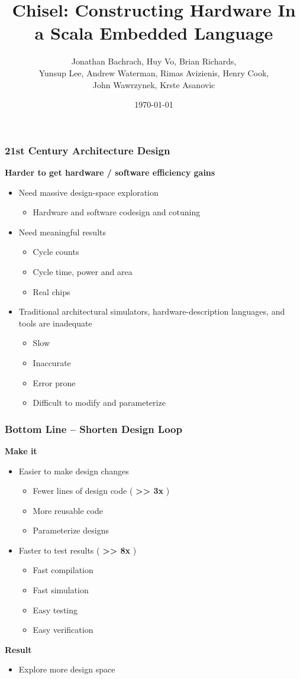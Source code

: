 \documentclass[xcolor=pdflatex,dvipsnames,table]{beamer}
\title[Chisel]{Chisel: Constructing Hardware In a Scala Embedded Language}
\author[Bachrach et al]{Jonathan Bachrach, Huy Vo, Brian Richards, \\
Yunsup Lee, Andrew Waterman, Rimas Avizienis, Henry Cook, \\
John Wawrzynek, Krste Asanovic}
\date{\today}
\institute[parlab]{EECS UC Berkeley}
\begin{document}
{
\begin{frame}
  \titlepage
\end{frame}
}
\addtocounter{framenumber}{-1}

\begin{frame}[fragile]
\frametitle{21st Century Architecture Design}
{\Large\textbf{Harder to get hardware / software efficiency gains}}
\vskip5mm
\begin{itemize}
\item Need massive design-space exploration
\begin{itemize}
\item Hardware and software codesign and cotuning
\end{itemize}
\item Need meaningful results
\begin{itemize}
\item Cycle counts
\item Cycle time, power and area
\item Real chips
\end{itemize}
\item Traditional architectural simulators, hardware-description
  languages, and tools are inadequate
\begin{itemize}
\item Slow
\item Inaccurate
\item Error prone
\item Difficult to modify and parameterize
\end{itemize}
\end{itemize}
\end{frame}

\begin{frame}[fragile]
\frametitle{Bottom Line -- Shorten Design Loop}
{\LARGE\textbf{Make it}}
\vskip2mm
\begin{itemize}
\item Easier to make design changes
\begin{itemize}
\item Fewer lines of design code ( \textbf{>> 3x} )
\item More reusable code
\item Parameterize designs
\end{itemize}
\item Faster to test results ( \textbf{>> 8x} )
\begin{itemize}
\item Fast compilation
\item Fast simulation
\item Easy testing
\item Easy verification
\end{itemize}
\end{itemize}
\vskip0.8cm
{\LARGE\textbf{Result}}
\begin{itemize}
\item Explore more design space
\end{itemize}

\end{frame}
\end{document}
